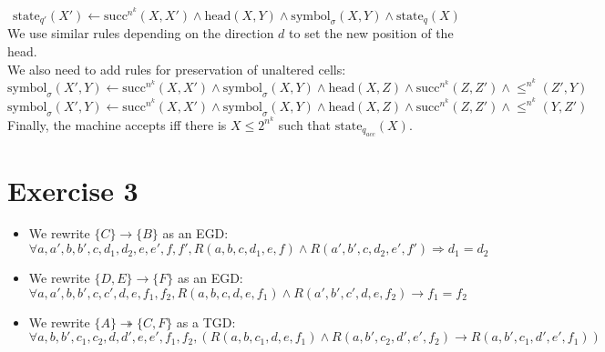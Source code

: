 \documentclass{cours}
\begin{document}
\[
	\mathrm{state}_{q'}(X') \gets \mathrm{succ}^{n^{k}}(X, X') \land \mathrm{head}(X, Y) \land \mathrm{symbol}_{\sigma}(X, Y) \land \mathrm{state}_{q}(X)
\]
We use similar rules depending on the direction $d$ to set the new position of the head.\\
We also need to add rules for preservation of unaltered cells: 
\[
	\mathrm{symbol}_{\sigma}(X', Y) \gets \mathrm{succ}^{n^{k}}(X, X') \land \mathrm{symbol}_{\sigma}(X, Y) \land \mathrm{head}(X, Z) \land \mathrm{succ}^{n^{k}}(Z, Z') \land \leq^{n^{k}} (Z', Y)
\]
\[
	\mathrm{symbol}_{\sigma}(X', Y) \gets \mathrm{succ}^{n^{k}}(X, X') \land \mathrm{symbol}_{\sigma}(X, Y) \land \mathrm{head}(X, Z) \land \mathrm{succ}^{n^{k}}(Z, Z') \land \leq^{n^{k}} (Y, Z')
\]
Finally, the machine accepts iff there is $X \leq 2^{n^{k}}$ such that $\mathrm{state}_{q_{acc}}(X)$.

\section{Exercise 3}
\begin{itemize}
	\item We rewrite $\{C\} \to \{B\}$ as an EGD: \[\forall a, a', b, b', c, d_{1}, d_{2}, e, e', f, f', R(a, b, c, d_{1}, e, f) \land R(a', b', c, d_{2}, e', f') \Rightarrow d_{1} = d_{2}\]
	\item We rewrite $\{D, E\} \to \{F\}$ as an EGD: \[\forall a, a', b, b', c, c',  d, e, f_{1}, f_{2}, R(a, b, c, d, e, f_{1}) \land R(a', b', c', d, e, f_{2}) \to f_{1} = f_{2}\]
	\item We rewrite $\{A\} \twoheadrightarrow \{C, F\}$ as a TGD: \[\forall a, b, b', c_{1}, c_{2}, d, d', e, e', f_{1}, f_{2}, \left(R(a, b, c_{1}, d, e, f_{1}) \land R(a, b', c_{2}, d', e', f_{2}) \to R(a, b', c_{1}, d', e', f_{1})\right)\]

\end{itemize}
\end{document}
